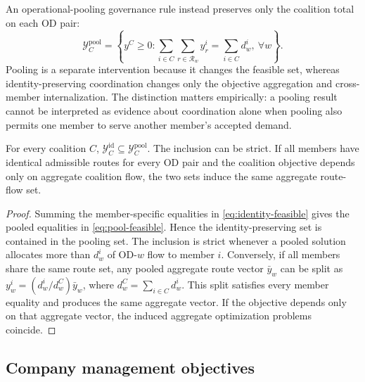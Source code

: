 An operational-pooling governance rule instead preserves only the coalition total on each OD pair:
\begin{equation}\label{eq:pool-feasible}
 \mathcal Y_C^{\mathrm{pool}}=
 \left\{y^C\geq0:\sum_{i\in C}\sum_{r\in\mathcal R_w}y_r^i
 =\sum_{i\in C}d_w^i,\ \forall w\right\}.
\end{equation}
Pooling is a separate intervention because it changes the feasible set, whereas identity-preserving coordination changes only the objective aggregation and cross-member internalization. The distinction matters empirically: a pooling result cannot be interpreted as evidence about coordination alone when pooling also permits one member to serve another member's accepted demand.

\begin{proposition}\label{prop:pooling}
For every coalition $C$, $\mathcal Y_C^{\mathrm{id}}\subseteq\mathcal Y_C^{\mathrm{pool}}$. The inclusion can be strict. If all members have identical admissible routes for every OD pair and the coalition objective depends only on aggregate coalition flow, the two sets induce the same aggregate route-flow set.
\end{proposition}

\begin{proof}
Summing the member-specific equalities in \eqref{eq:identity-feasible} gives the pooled equalities in \eqref{eq:pool-feasible}. Hence the identity-preserving set is contained in the pooling set. The inclusion is strict whenever a pooled solution allocates more than $d_w^i$ of OD-$w$ flow to member $i$. Conversely, if all members share the same route set, any pooled aggregate route vector $\bar y_w$ can be split as $y_w^i=(d_w^i/d_w^C)\bar y_w$, where $d_w^C=\sum_{i\in C}d_w^i$. This split satisfies every member equality and produces the same aggregate vector. If the objective depends only on that aggregate vector, the induced aggregate optimization problems coincide.
\end{proof}

\subsection{Company management objectives}\label{sec:model_objectives}


